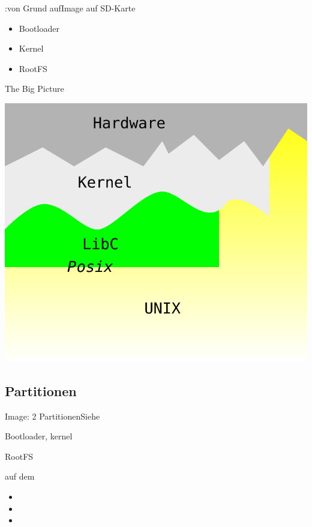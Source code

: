 \begin{frame}{\linux:von Grund auf}{Image auf SD-Karte}
 \begin{itemize}
  \item Bootloader
  \item Kernel
  \item RootFS
 \end{itemize}
\end{frame}

\begin{frame}{The Big Picture}
\begin{center}
 \includegraphics[height=0.875\textheight]{layers.pdf}
\end{center}
\end{frame}

\subsection{Partitionen}
\begin{frame}{Image: 2 Partitionen}{Siehe }
 \begin{description}[Partition 1: p1]
  \item[Partition 1: p1]  Bootloader, kernel 
  \item[Partition 2: p2]  RootFS
  \item[Befehle] auf dem \host
  \begin{itemize}
   \item {} 
   \item {}
   \item {}
  \end{itemize}
 \end{description}
\end{frame}

